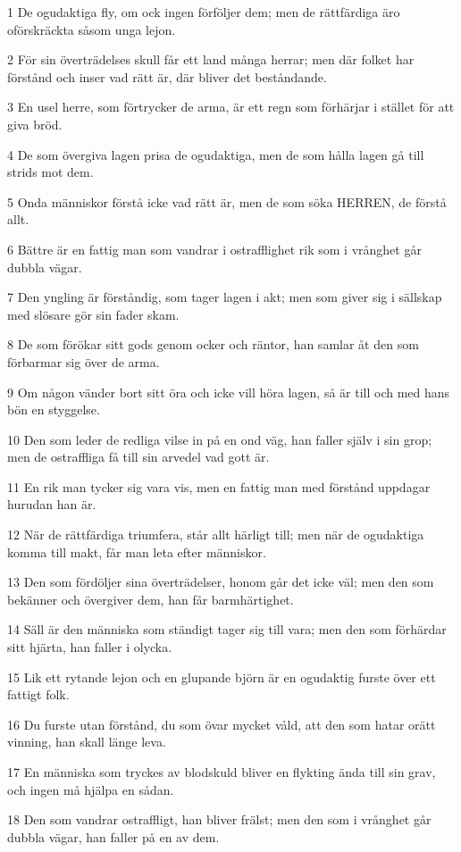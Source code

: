 \par 1 De ogudaktiga fly, om ock ingen förföljer dem; men de rättfärdiga äro oförskräckta såsom unga lejon.
\par 2 För sin överträdelses skull får ett land många herrar; men där folket har förstånd och inser vad rätt är, där bliver det beståndande.
\par 3 En usel herre, som förtrycker de arma, är ett regn som förhärjar i stället för att giva bröd.
\par 4 De som övergiva lagen prisa de ogudaktiga, men de som hålla lagen gå till strids mot dem.
\par 5 Onda människor förstå icke vad rätt är, men de som söka HERREN, de förstå allt.
\par 6 Bättre är en fattig man som vandrar i ostrafflighet rik som i vrånghet går dubbla vägar.
\par 7 Den yngling är förståndig, som tager lagen i akt; men som giver sig i sällskap med slösare gör sin fader skam.
\par 8 De som förökar sitt gods genom ocker och räntor, han samlar åt den som förbarmar sig över de arma.
\par 9 Om någon vänder bort sitt öra och icke vill höra lagen, så är till och med hans bön en styggelse.
\par 10 Den som leder de redliga vilse in på en ond väg, han faller själv i sin grop; men de ostraffliga få till sin arvedel vad gott är.
\par 11 En rik man tycker sig vara vis, men en fattig man med förstånd uppdagar hurudan han är.
\par 12 När de rättfärdiga triumfera, står allt härligt till; men när de ogudaktiga komma till makt, får man leta efter människor.
\par 13 Den som fördöljer sina överträdelser, honom går det icke väl; men den som bekänner och övergiver dem, han får barmhärtighet.
\par 14 Säll är den människa som ständigt tager sig till vara; men den som förhärdar sitt hjärta, han faller i olycka.
\par 15 Lik ett rytande lejon och en glupande björn är en ogudaktig furste över ett fattigt folk.
\par 16 Du furste utan förstånd, du som övar mycket våld, att den som hatar orätt vinning, han skall länge leva.
\par 17 En människa som tryckes av blodskuld bliver en flykting ända till sin grav, och ingen må hjälpa en sådan.
\par 18 Den som vandrar ostraffligt, han bliver frälst; men den som i vrånghet går dubbla vägar, han faller på en av dem.
